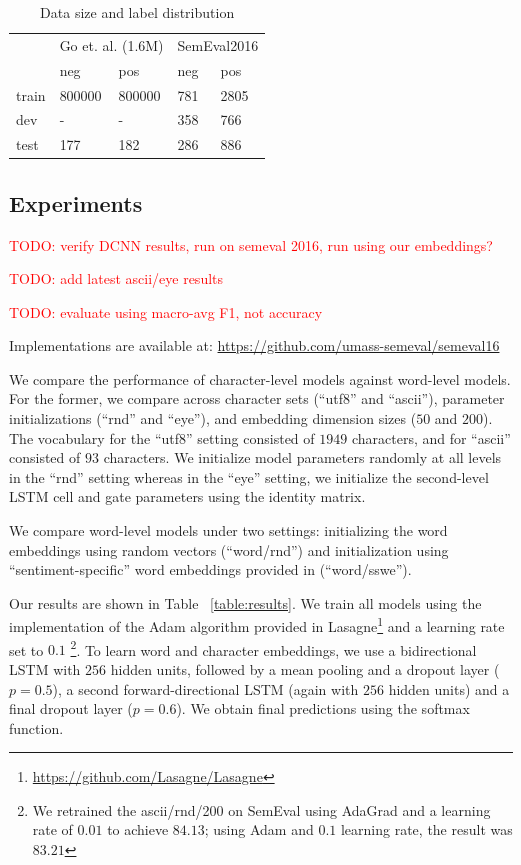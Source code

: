 \documentclass{article} %
\newcommand{\todo}[1]{\textcolor{red}{TODO: #1}}
\begin{document}
\begin{table}[h!]
\centering
\caption{Data size and label distribution}
\begin{tabular}{|lllll|}
\hline
      & \multicolumn{2}{l}{Go et. al. (1.6M)} & \multicolumn{2}{l}{SemEval2016} \\
      & neg               & pos               & neg            & pos            \\
\hline
train & 800000            & 800000            & 781            & 2805           \\
dev   & -                 & -                 & 358            & 766            \\
test  & 177               & 182               & 286            & 886           \\
\hline
\end{tabular}
\label{table:corpus}
\end{table}

\subsection{Experiments}
\todo{verify DCNN results, run on semeval 2016, run using our embeddings?}

\todo{add latest ascii/eye results}

\todo{evaluate using macro-avg F1, not accuracy}

Implementations are available at: \url{https://github.com/umass-semeval/semeval16}

We compare the performance of character-level models against word-level models. For the former, we compare across character sets (``utf8'' and ``ascii''), parameter initializations (``rnd'' and ``eye''), and embedding dimension sizes ($50$ and $200$). The vocabulary for the ``utf8'' setting consisted of $1949$ characters, and for ``ascii'' consisted of $93$ characters. We initialize model parameters randomly at all levels in the ``rnd'' setting whereas in the ``eye'' setting, we initialize the second-level LSTM cell and gate parameters using the identity matrix.

We compare word-level models under two settings: initializing the word embeddings using random vectors (``word/rnd'') and initialization using ``sentiment-specific'' word embeddings provided in \cite{tang2014learning} (``word/sswe'').

Our results are shown in Table ~\ref{table:results}. We train all models using the implementation of the Adam algorithm \cite{kingma2014adam} provided in Lasagne\footnote{\url{https://github.com/Lasagne/Lasagne}} and a learning rate set to $0.1$ \footnote{We retrained the ascii/rnd/200 on SemEval using AdaGrad and a learning rate of $0.01$ to achieve $84.13$; using Adam and $0.1$ learning rate, the result was $83.21$}. To learn word and character embeddings, we use a bidirectional LSTM with $256$ hidden units, followed by a mean pooling and a dropout layer ($p=0.5$), a second forward-directional LSTM (again with $256$ hidden units) and a final dropout layer ($p=0.6$). We obtain final predictions using the softmax function.
\end{document}
